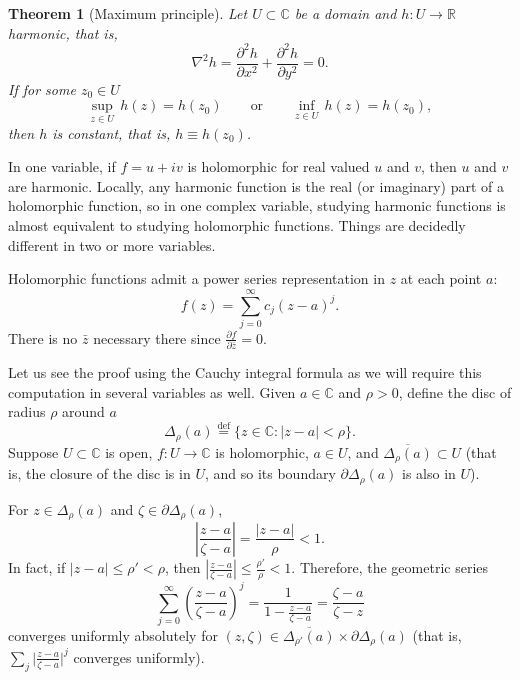 \documentclass[12pt,openany]{book}
\newcommand{\sabs}[1]{\lvert {#1} \rvert}
\newcommand{\abs}[1]{\left\lvert {#1} \right\rvert}
\newcommand{\C}{{\mathbb{C}}}
\newcommand{\R}{{\mathbb{R}}}
\theoremstyle{plain}
\newtheorem{thm}{Theorem}[section]
\theoremstyle{remark}
\theoremstyle{definition}
\theoremstyle{exercise}
\theoremstyle{example}
\begin{document}
\begin{thm}[Maximum principle]
Let $U \subset \C$ be a domain and $h \colon U \to \R$
harmonic, that is,
%
\begin{equation*}
\nabla^2 h = \frac{\partial^2 h}{\partial x^2} + \frac{\partial^2 h}{\partial
y^2} = 0 .
\end{equation*}
If for some $z_0 \in U$
\begin{equation*}
\sup_{z \in U} \, h(z) = h(z_0)
\qquad \text{or} \qquad
\inf_{z \in U} \, h(z) = h(z_0) ,
\end{equation*}
then $h$ is constant, that is, $h \equiv h(z_0)$.
\end{thm}

In one variable, if $f = u+iv$ is holomorphic for real valued $u$ and $v$,
then $u$ and $v$ are harmonic.  Locally, any harmonic function is
the real (or imaginary) part of a holomorphic function, so in
one complex variable, studying 
harmonic functions is almost equivalent to studying holomorphic
functions.  Things are decidedly different
in two or more variables.

\medskip

Holomorphic functions admit a power series representation in $z$
at each point $a$:
\begin{equation*}
f(z) = \sum_{j=0}^\infty c_j {(z-a)}^j .
\end{equation*}
There is no $\bar{z}$ necessary there
since $\frac{\partial f}{\partial \bar{z}} = 0$.

Let us see the proof using the Cauchy integral formula as we will
require this computation in several variables as well.
Given $a \in \C$ and $\rho > 0$, define the disc of radius $\rho$ around $a$
%
\begin{equation*}
\Delta_\rho(a)
\overset{\text{def}}{=}
\bigl\{ z \in \C : \sabs{z-a} < \rho \bigr\} .
\end{equation*}
Suppose $U \subset \C$ is open, $f \colon U \to \C$ is holomorphic,
$a \in U$, and $\overline{\Delta_\rho(a)} \subset U$ (that is, the closure
of the disc is in $U$, and so its boundary $\partial \Delta_\rho(a)$ is also in $U$).

For $z \in \Delta_\rho(a)$ and $\zeta \in \partial \Delta_\rho(a)$, 
\begin{equation*}
\abs{\frac{z-a}{\zeta-a}} =
\frac{\sabs{z-a}}{\rho} < 1 .
\end{equation*}
In fact, if $\sabs{z-a} \leq \rho' < \rho$, then
$\abs{\frac{z-a}{\zeta-a}} \leq \frac{\rho'}{\rho} < 1$.  Therefore,
the geometric series
\begin{equation*}
\sum_{j=0}^\infty
{\left(\frac{z-a}{\zeta-a}\right)}^j
=
\frac{1}{1-
\frac{z-a}{\zeta-a}}
=
\frac{\zeta-a}{\zeta-z}
\end{equation*}
converges uniformly absolutely for $(z,\zeta) \in \overline{\Delta_{\rho'}(a)}
\times \partial \Delta_\rho(a)$ (that is, $\sum_j {\bigl\lvert
\frac{z-a}{\zeta-a} \bigr\rvert}^j$
converges uniformly).
\end{document}
